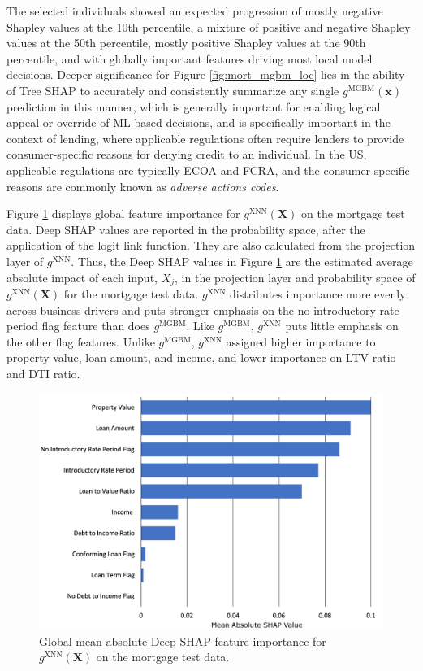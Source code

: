 \documentclass[information,article,accept,moreauthors,pdftex]{Definitions/mdpi}
\begin{document}
  The selected individuals showed an expected progression of mostly negative Shapley values at the 10{th} percentile, a mixture of positive and negative Shapley values at the 50{th} percentile, mostly positive Shapley values at the 90{th} percentile, and with globally important features driving most local model decisions. Deeper significance for Figure \ref{fig:mort_mgbm_loc} lies in the ability of Tree SHAP to accurately and consistently summarize any single $g^\text{MGBM}(\mathbf{x})$ prediction in this manner, which is generally important for enabling logical appeal or override of ML-based decisions, and is specifically important in the context of lending, where applicable regulations often require lenders to provide consumer-specific reasons for denying credit to an individual. In the US, applicable regulations are typically ECOA and FCRA, and the consumer-specific reasons are commonly known as \textit{adverse actions codes}.

Figure \ref{fig:mort_xnn_glob} displays global feature importance for $g^\text{XNN}(\mathbf{X})$ on the mortgage test data. Deep SHAP values are reported in the probability space, after the application of the logit link function. They are also calculated from the projection layer of $g^\text{XNN}$. Thus, the Deep SHAP values in Figure \ref{fig:mort_xnn_glob} are the estimated average absolute impact of each input, $X_j$, in the projection layer and probability space of $g^\text{XNN}(\mathbf{X})$ for the mortgage test data. $g^\text{XNN}$ distributes importance more evenly across business drivers and puts stronger emphasis on the no introductory rate period flag feature than does $g^\text{MGBM}$. Like $g^\text{MGBM}$, $g^\text{XNN}$ puts little emphasis on the other flag features.  Unlike $g^\text{MGBM}$, $g^\text{XNN}$ assigned higher importance to property value, loan amount, and income, and lower importance on LTV ratio and DTI ratio.  

\begin{figure}[H]
\centering
\includegraphics[width=12cm]{img/mort_xnn_glob.png}
\caption{Global mean absolute Deep SHAP feature importance for $g^\text{XNN}(\mathbf{X})$ on the mortgage test data.}
\label{fig:mort_xnn_glob}
\end{figure} 
\end{document}

